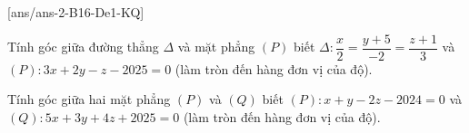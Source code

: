 [ans/ans-2-B16-De1-KQ]
\caukq
\begin{ex}%
Tính góc giữa đường thẳng $\Delta$ và mặt phẳng $(P)$ biết $\Delta\colon \dfrac{x}{2}=\dfrac{y+5}{-2}=\dfrac{z+1}{3}$ và $(P)\colon 3x+2y-z-2025=0$ (làm tròn đến hàng đơn vị của độ).
\end{ex}
\begin{ex}%
	Tính góc giữa hai mặt phẳng $(P)$ và $(Q)$ biết $(P)\colon x+y-2z-2024=0$ và $(Q)\colon 5x+3y+4z+2025=0$ (làm tròn đến hàng đơn vị của độ).
\end{ex}

